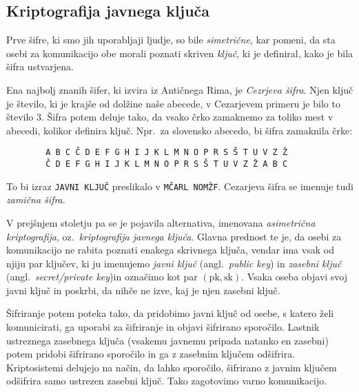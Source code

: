\documentclass[isrm2, tisk]{fmfdelo}
\begin{document}
\subsection{Kriptografija javnega ključa}
Prve šifre, ki smo jih uporabljaji ljudje, so bile \textit{simetrične}, kar pomeni, da sta osebi 
za komunikacijo obe morali poznati skriven \textit{ključ}, ki je definiral, kako je bila šifra 
ustvarjena. 

\begin{primer}
    Ena najbolj znanih šifer, ki izvira iz Antičnega Rima, je \textit{Cezrjeva šifra}. Njen ključ 
    je število, ki je krajše od dolžine naše abecede, v Cezarjevem primeru je bilo to število $3$.
    Šifra potem deluje tako, da vsako črko zamaknemo za toliko mest v abecedi, kolikor definira 
    ključ. Npr.\ za slovensko abecedo, bi šifra zamaknila črke:
    \begin{verbatim}
        A B C Č D E F G H I J K L M N O P R S Š T U V Z Ž
        Č D E F G H I J K L M N O P R S Š T U V Z Ž A B C
    \end{verbatim}
    To bi izraz \texttt{JAVNI KLJUČ} preslikalo v \texttt{MČARL NOMŽF}. Cezarjeva šifra se imenuje 
    tudi \textit{zamična šifra}.
\end{primer}

V prejšnjem stoletju pa se je pojavila alternativa, imenovana \textit{asimetrična kriptografija}, oz.\
\textit{kriptografija javnega ključa}. Glavna prednost te je, da osebi za komunikacijo ne rabita 
poznati enakega skrivnega ključa, vendar ima vsak od njiju par ključev, ki ju imenujemo \textit{javni 
ključ} (angl.\ \textit{public key}) in \textit{zasebni ključ} (angl.\ \textit{secret/private key})in 
označimo kot par $(\text{pk}, \text{sk})$. Vsaka oseba objavi svoj javni ključ in poskrbi, da nihče 
ne izve, kaj je njen zasebni ključ. 

Šifriranje potem poteka tako, da pridobimo javni ključ od osebe, s katero želi komunicirati, ga uporabi
za šifriranje in objavi šifrirano sporočilo. Lastnik ustreznega zasebnega ključa (vsakemu javnemu pripada 
natanko en zasebni) potem pridobi šifrirano sporočilo in ga z zasebnim ključem odšifrira. Kriptosistemi 
delujejo na način, da lahko sporočilo, šifrirano z javnim ključem odšifrira samo ustrezen zasebni ključ. 
Tako zagotovimo varno komunikacijo. 
\end{document}
